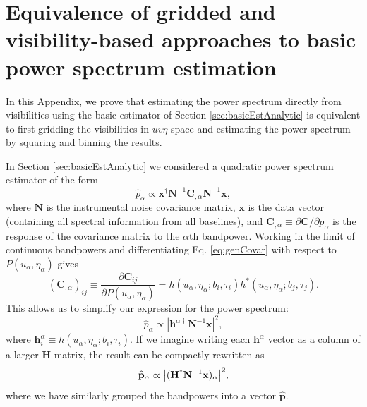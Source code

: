 \documentclass[twocolumn,aps,prd,nofootinbib,showpacs]{revtex4-1}
\begin{document}
\section{Equivalence of gridded and visibility-based approaches to basic power spectrum estimation}
\label{appendix:GridVsVisEquiv}

In this Appendix, we prove that estimating the power spectrum directly from visibilities using the basic estimator of Section \ref{sec:basicEstAnalytic} is equivalent to first gridding the visibilities in $uv\eta$ space and estimating the power spectrum by squaring and binning the results.

In Section \ref{sec:basicEstAnalytic} we considered a quadratic power spectrum estimator of the form
\begin{equation}
\widehat{p}_\alpha \propto \mathbf{x}^\dagger \mathbf{N}^{-1} \mathbf{C}_{,\alpha} \mathbf{N}^{-1} \mathbf{x},
\end{equation}
where $\mathbf{N}$ is the instrumental noise covariance matrix, $\mathbf{x}$ is the data vector (containing all spectral information from all baselines), and $\mathbf{C}_{,\alpha} \equiv \partial \mathbf{C} / \partial p_\alpha$ is the response of the covariance matrix to the $\alpha$th bandpower.  Working in the limit of continuous bandpowers and differentiating  Eq. \eqref{eq:genCovar} with respect to $P(u_\alpha, \eta_\alpha)$ gives
\begin{equation}
(\mathbf{C}_{,\alpha})_{ij} \equiv \frac{\partial \mathbf{C}_{ij}}{\partial P(u_\alpha, \eta_\alpha)} = h(u_\alpha, \eta_\alpha; b_i, \tau_i) h^* (u_\alpha, \eta_\alpha; b_j, \tau_j).
\end{equation}
This allows us to simplify our expression for the power spectrum:
\begin{equation}
\widehat{p}_\alpha \propto | \mathbf{h}^{\alpha \dagger} \mathbf{N}^{-1} \mathbf{x} |^2,
\end{equation}
where $\mathbf{h}^\alpha_i \equiv h(u_\alpha, \eta_\alpha; b_i, \tau_i )$.  If we imagine writing each $\mathbf{h}^\alpha$ vector as a column of a larger $\mathbf{H}$ matrix, the result can be compactly rewritten as
\begin{equation}
\label{eq:SqEst1}
\widehat{\mathbf{p}}_\alpha \propto \big{|} (\mathbf{H}^{\dagger} \mathbf{N}^{-1} \mathbf{x})_\alpha \big{|}^2,
\end{equation}
where we have similarly grouped the bandpowers into a vector $\widehat{\mathbf{p}}$.
\end{document}
